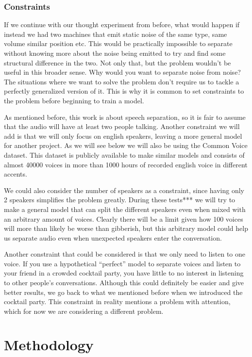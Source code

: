 \documentclass{book}
\begin{document}
\section{Constraints}
\qquad If we continue with our thought experiment from before, what would happen if instead we had two machines that emit static noise of the same type, same volume similar position etc. This would be practically impossible to separate without knowing more about the noise being emitted to try and find some structural difference in the two. Not only that, but the problem wouldn’t be useful in this broader sense. Why would you want to separate noise from noise? The situations where we want to solve the problem don’t require us to tackle a perfectly generalized version of it. This is why it is common to set constraints to the problem before beginning to train a model.
\par
As mentioned before, this work is about speech separation, so it is fair to assume that the audio will have at least two people talking. Another constraint we will add is that we will only focus on english speakers, leaving a more general model for another project. As we will see below we will also be using the Common Voice dataset. This dataset is publicly available to make similar models and consists of almost 40000 voices in more than 1000 hours of recorded english voice in different accents.
\par
We could also consider the number of speakers as a constraint, since having only 2 speakers simplifies the problem greatly. During these tests*** we will try to make a general model that can split the different speakers even when mixed with an arbitrary amount of voices. Clearly there will be a limit given how 100 voices will more than likely be worse than gibberish, but this arbitrary model could help us separate audio even when unexpected speakers enter the conversation.
\par
Another constraint that could be considered is that we only need to listen to one voice. If you use a hypothetical “perfect” model to separate voices and listen to your friend in a crowded cocktail party, you have little to no interest in listening to other people's conversations. Although this could definitely be easier and give better results, we go back to what we mentioned before when we introduced the cocktail party. This constraint in reality mentions a problem with attention, which for now we are considering a different problem.

\part{Methodology}
\end{document}
